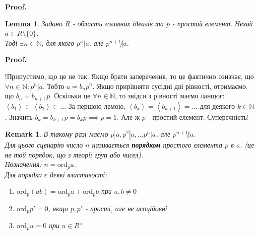\documentclass[a4paper, 10pt]{article}
\makeatletter
\theoremstyle{theoremdd}
\theoremstyle{theoremdd}
\theoremstyle{theoremdd}
\theoremstyle{theoremdd}
\theoremstyle{theoremdd}
\theoremstyle{theoremdd}
\newtheorem{remark}[theorem]{Remark}
\theoremstyle{theoremdd}
\newtheorem{lemma}[theorem]{Lemma}
\theoremstyle{theoremdd}
\renewenvironment{proof}[1][Proof.\\]{\par
\pushQED{\hfill \qed}%
\normalfont \topsep6\p@\@plus6\p@\relax
\trivlist
\item\relax
{\bfseries
#1\@addpunct{.}}\hspace\labelsep\ignorespaces
}{%
\popQED\endtrivlist\@endpefalse
}
\makeatother
\begin{document}
\begin{proof}
\begin{lemma}
Задано $R$ - область головних ідеалів та $p$ - простий елемент. Нехай $a \in R \setminus \{0\}$. \\
Тоді $\exists n \in \mathbb{N}$, для якого $p^n |a$, але $p^{n+1} \not| a$.
\end{lemma}

\begin{proof}
!Припустимо, що це не так. Якщо брати заперечення, то це фактично означає, що $\forall n \in \mathbb{N}: p^n |a$. Тобто $a = b_n p^n$. Якщо прирівняти сусідні дві рівності, отримаємо, що $b_n = b_{n+1}p$. Оскільки це $\forall n \in \mathbb{N}$, то звідси з рівності маємо ланцюг:\\
$\left< b_1 \right> \subset \left< b_2 \right> \subset \dots$ За першою лемою, $\left< b_k \right> = \left< b_{k+1} \right> = \dots$ для деякого $k \in \mathbb{N}$. Значить $b_k = b_{k+1}p = b_k p \implies p = 1$. Але ж $p$ - простий елемент. Суперечність!
\end{proof}

\begin{remark}
В такому разі маємо $p | a, p^2 | a, \dots p^n |a$, але $p^{n+1} \not| a$.\\
Для цього сценарію число $n$ називається \textbf{порядком} простого елемента $p$ в $a$. (це не той порядок, що з теорії груп або чисел).\\
Позначення: $n = \text{ord}_p a$.
\bigskip \\
Для порядка є деякі властивості:
\begin{enumerate}
\item $\text{ord}_p(ab) = \text{ord}_p a + \text{ord}_p b$ при $a,b \neq 0$
\item $\text{ord}_p p' = 0$, якщо $p,p'$ - прості, але не асоційовні
\item $\text{ord}_p u = 0$ при $u \in R^\times$
\end{enumerate}
\end{remark}


\end{proof}
\end{document}
